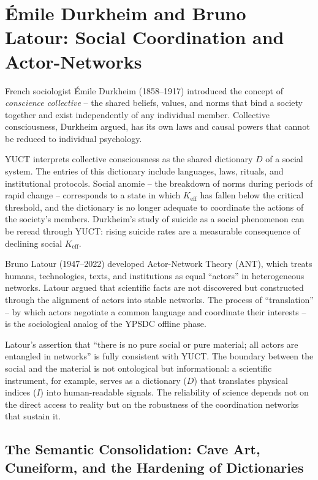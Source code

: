 \documentclass[12pt,a4paper]{article}
\begin{document}
	\section{Émile Durkheim and Bruno Latour: Social Coordination and Actor-Networks}
	
	French sociologist Émile Durkheim (1858–1917) introduced the concept of \emph{conscience collective} -- the shared beliefs, values, and norms that bind a society together and exist independently of any individual member. Collective consciousness, Durkheim argued, has its own laws and causal powers that cannot be reduced to individual psychology.
	
	YUCT interprets collective consciousness as the shared dictionary \(D\) of a social system. The entries of this dictionary include languages, laws, rituals, and institutional protocols. Social anomie -- the breakdown of norms during periods of rapid change -- corresponds to a state in which \(K_{\mathrm{eff}}\) has fallen below the critical threshold, and the dictionary is no longer adequate to coordinate the actions of the society's members. Durkheim's study of suicide as a social phenomenon can be reread through YUCT: rising suicide rates are a measurable consequence of declining social \(K_{\mathrm{eff}}\).
	
	Bruno Latour (1947–2022) developed Actor-Network Theory (ANT), which treats humans, technologies, texts, and institutions as equal ``actors'' in heterogeneous networks. Latour argued that scientific facts are not discovered but constructed through the alignment of actors into stable networks. The process of ``translation'' -- by which actors negotiate a common language and coordinate their interests -- is the sociological analog of the YPSDC offline phase.
	
	Latour's assertion that ``there is no pure social or pure material; all actors are entangled in networks'' is fully consistent with YUCT. The boundary between the social and the material is not ontological but informational: a scientific instrument, for example, serves as a dictionary (\(D\)) that translates physical indices (\(I\)) into human-readable signals. The reliability of science depends not on the direct access to reality but on the robustness of the coordination networks that sustain it.
	
	\subsection{The Semantic Consolidation: Cave Art, Cuneiform, and the Hardening of Dictionaries}
	\label{subsec:semantic-consolidation}
	
\end{document}
